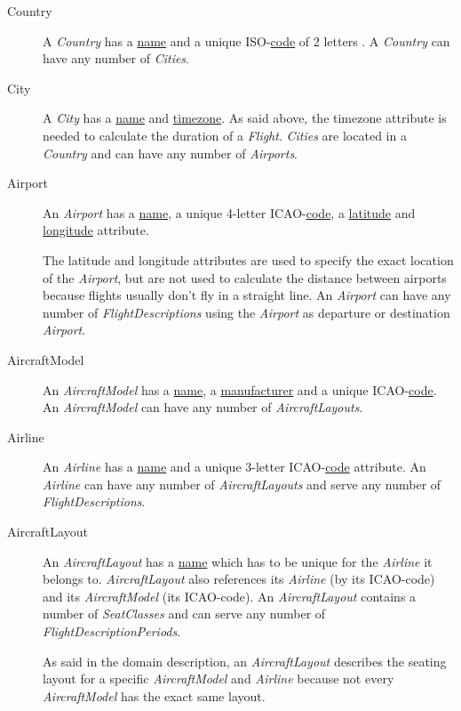 \documentclass[a4paper,11pt]{article}
\newcommand{\npar}{\par \vspace{2.3ex plus 0.3ex minus 0.3ex} \noindent}
\newcommand{\spar}{\par \noindent}
\newcommand{\dsltype}[1]{\textit{#1}}
\newcommand{\dslattr}[1]{\uline{#1}}
\begin{document}
\begin{description}
\item[Country]
A \dsltype{Country} has a \dslattr{name} and a unique ISO-\dslattr{code} of 2 letters \citep{iso_country}. A \dsltype{Country} can have any number of \dsltype{Cities}.

\item[City]
A \dsltype{City} has a \dslattr{name} and \dslattr{timezone}. As said above, the timezone attribute is needed to calculate the duration of a \dsltype{Flight}. \dsltype{Cities} are located in a \dsltype{Country} and can have any number of \dsltype{Airports}.

\item[Airport]
An \dsltype{Airport} has a \dslattr{name}, a unique 4-letter ICAO-\dslattr{code}, a \dslattr{latitude} and \dslattr{longitude} attribute.
\spar The latitude and longitude attributes are used to specify the exact location of the \dsltype{Airport}, but are not used to calculate the distance between airports because flights usually don't fly in a straight line. An \dsltype{Airport} can have any number of \dsltype{FlightDescriptions} using the \dsltype{Airport} as departure or destination \dsltype{Airport}.

\item[AircraftModel]
An \dsltype{AircraftModel} has a \dslattr{name}, a \dslattr{manufacturer} and a unique ICAO-\dslattr{code}. An \dsltype{AircraftModel} can have any number of \dsltype{AircraftLayouts}.

\item[Airline]
An \dsltype{Airline} has a \dslattr{name} and a unique 3-letter ICAO-\dslattr{code} attribute. An \dsltype{Airline} can have any number of \dsltype{AircraftLayouts} and serve any number of \dsltype{FlightDescriptions}.

\item[AircraftLayout]
An \dsltype{AircraftLayout} has a \dslattr{name} which has to be unique for the \dsltype{Airline} it belongs to. \dsltype{AircraftLayout} also references its \dsltype{Airline} (by its ICAO-code) and its \dsltype{AircraftModel} (its ICAO-code). An \dsltype{AircraftLayout} contains a number of \dsltype{SeatClasses} and can serve any number of \dsltype{FlightDescriptionPeriods}.

\npar As said in the domain description, an \dsltype{AircraftLayout} describes the seating layout for a specific \dsltype{AircraftModel} and \dsltype{Airline} because not every \dsltype{AircraftModel} has the exact same layout.


\end{description}
\end{document}
